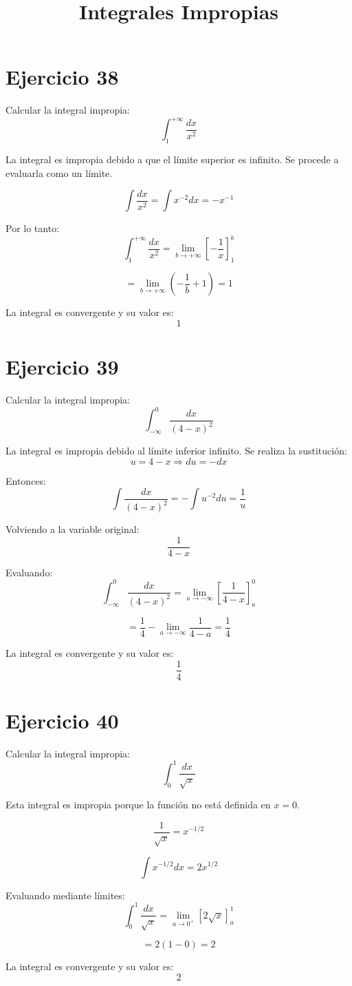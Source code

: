 \documentclass[12pt]{article}
\title{Integrales Impropias}
\author{}
\date{}
\begin{document}
\maketitle

\section*{Ejercicio 38}
Calcular la integral impropia:
\[
\int_{1}^{+\infty} \frac{dx}{x^2}
\]

La integral es impropia debido a que el límite superior es infinito. Se procede a evaluarla como un límite.

\[
\int \frac{dx}{x^2} = \int x^{-2} dx = -x^{-1}
\]

Por lo tanto:
\[
\int_{1}^{+\infty} \frac{dx}{x^2}
= \lim_{b \to +\infty} \left[ -\frac{1}{x} \right]_{1}^{b}
\]

\[
= \lim_{b \to +\infty} \left(-\frac{1}{b} + 1\right) = 1
\]

La integral es convergente y su valor es:
\[
\boxed{1}
\]

\section*{Ejercicio 39}
Calcular la integral impropia:
\[
\int_{-\infty}^{0} \frac{dx}{(4-x)^2}
\]

La integral es impropia debido al límite inferior infinito. Se realiza la sustitución:
\[
u = 4 - x \Rightarrow du = -dx
\]

Entonces:
\[
\int \frac{dx}{(4-x)^2} = -\int u^{-2} du = \frac{1}{u}
\]

Volviendo a la variable original:
\[
\frac{1}{4-x}
\]

Evaluando:
\[
\int_{-\infty}^{0} \frac{dx}{(4-x)^2}
= \lim_{a \to -\infty} \left[ \frac{1}{4-x} \right]_{a}^{0}
\]

\[
= \frac{1}{4} - \lim_{a \to -\infty} \frac{1}{4-a}
= \frac{1}{4}
\]

La integral es convergente y su valor es:
\[
\boxed{\frac{1}{4}}
\]

\section*{Ejercicio 40}
Calcular la integral impropia:
\[
\int_{0}^{1} \frac{dx}{\sqrt{x}}
\]

Esta integral es impropia porque la función no está definida en $x = 0$.

\[
\frac{1}{\sqrt{x}} = x^{-1/2}
\]

\[
\int x^{-1/2} dx = 2x^{1/2}
\]

Evaluando mediante límites:
\[
\int_{0}^{1} \frac{dx}{\sqrt{x}}
= \lim_{a \to 0^+} \left[2\sqrt{x}\right]_{a}^{1}
\]

\[
= 2(1 - 0) = 2
\]

La integral es convergente y su valor es:
\[
\boxed{2}
\]
\end{document}
